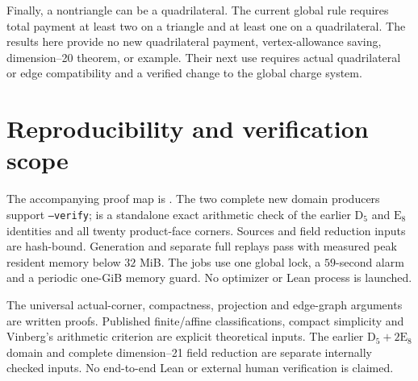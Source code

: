 \documentclass[11pt]{article}
\newcommand{\E}{\mathrm E}
\newcommand{\D}{\mathrm D}
\begin{document}
Finally, a nontriangle can be a quadrilateral. The current global rule
requires total payment at least two on a triangle and at least one on
a quadrilateral. The results here provide no new quadrilateral payment,
vertex-allowance saving, dimension--20 theorem, or example. Their next
use requires actual quadrilateral or edge compatibility and a verified
change to the global charge system.

\section{Reproducibility and verification scope}
The accompanying proof map is
.
The two complete new domain producers support \texttt{--verify};
 is a
standalone exact arithmetic check of the earlier $\D_5$ and $\E_8$
identities and all twenty product-face corners. Sources and field
reduction inputs are hash-bound. Generation and separate full replays
pass with measured peak resident memory below $32$ MiB. The jobs use
one global lock, a $59$-second alarm and a periodic one-GiB memory guard.
No optimizer or Lean process is launched.

The universal actual-corner, compactness, projection and edge-graph
arguments are written proofs. Published finite/affine classifications,
compact simplicity and Vinberg's arithmetic criterion are explicit
theoretical inputs. The earlier $\D_5+2\E_8$ domain and complete
dimension--21 field reduction are separate internally checked inputs.
No end-to-end Lean or external human verification is claimed.
\end{document}
